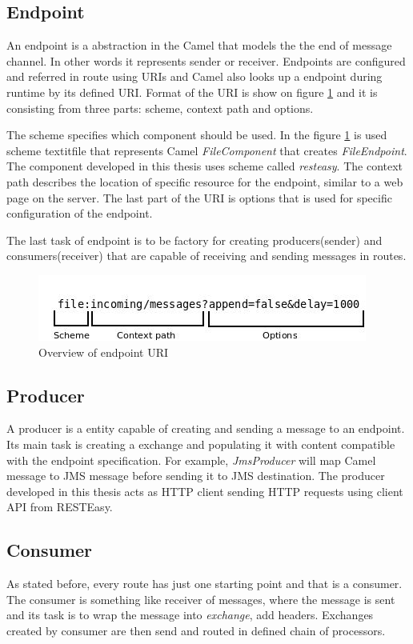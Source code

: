 \documentclass[12pt,final,oneside]{fithesis2}
\begin{document}
\subsection*{Endpoint}
An endpoint is a abstraction in the Camel that models the the end of message channel. In other words it represents sender or receiver. Endpoints are configured and referred in route using URIs and Camel also looks up a endpoint during runtime by its defined URI. Format of the URI is show on figure \ref{uri} and it is consisting from three parts: scheme, context path and options. 

The scheme specifies which component should be used. In the figure \ref{uri} is used scheme textit{file} that represents Camel \textit{FileComponent} that creates \textit{FileEndpoint}. The component developed in this thesis uses scheme called \textit{resteasy}. The context path describes the location of specific resource for the endpoint, similar to a web page on the server. The last part of the URI is options that is used for specific configuration of the endpoint.

The last task of endpoint is to be factory for creating producers(sender) and consumers(receiver) that are capable of receiving and sending messages in routes.

\begin{figure}
\centering
\includegraphics[width=0.9\linewidth]{sources/Diagram1.jpeg}
\caption{Overview of endpoint URI}
\label{uri}
\end{figure}

\subsection*{Producer}
A producer is a entity capable of creating and sending a message to an endpoint. Its main task is creating a exchange and populating it with content compatible with the endpoint specification. For example, \textit{JmsProducer} will map Camel message to JMS message before sending it to JMS destination. The producer developed in this thesis acts as HTTP client sending HTTP requests using client API from RESTEasy.


\subsection*{Consumer} 
As stated before, every route has just one starting point and that is a consumer. The consumer is something like receiver of messages, where the message is sent and its task is to wrap the message into \textit{exchange}, add headers. Exchanges created by consumer are then send and routed in defined chain of processors.
\end{document}
